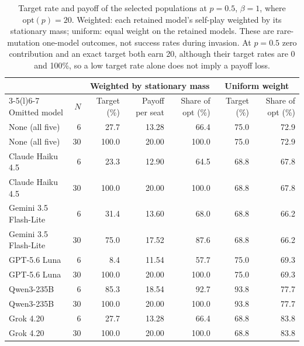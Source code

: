 \begin{table}[!htbp]
\caption{Target rate and payoff of the selected populations at $p=0.5$, $\beta=1$, where $\mathrm{opt}(p)=20$. Weighted: each retained model's self-play weighted by its stationary mass; uniform: equal weight on the retained models. These are rare-mutation one-model outcomes, not success rates during invasion. At $p=0.5$ zero contribution and an exact target both earn 20, although their target rates are 0 and 100\%, so a low target rate alone does not imply a payoff loss.}
\label{tab:review-welfare}
\centering\small\setlength{\tabcolsep}{4pt}
\begin{tabular}{@{}lrrrrrr@{}}
\toprule
 & & \multicolumn{3}{c}{Weighted by stationary mass} & \multicolumn{2}{c}{Uniform weight} \\
\cmidrule(lr){3-5}\cmidrule(l){6-7}
Omitted model & $N$ & Target (\%) & Payoff per seat & Share of opt (\%) & Target (\%) & Share of opt (\%) \\
\midrule
None (all five) & 6 & 27.7 & 13.28 & 66.4 & 75.0 & 72.9 \\
None (all five) & 30 & 100.0 & 20.00 & 100.0 & 75.0 & 72.9 \\
\addlinespace[2pt]
Claude Haiku 4.5 & 6 & 23.3 & 12.90 & 64.5 & 68.8 & 67.8 \\
Claude Haiku 4.5 & 30 & 100.0 & 20.00 & 100.0 & 68.8 & 67.8 \\
\addlinespace[2pt]
Gemini 3.5 Flash-Lite & 6 & 31.4 & 13.60 & 68.0 & 68.8 & 66.2 \\
Gemini 3.5 Flash-Lite & 30 & 75.0 & 17.52 & 87.6 & 68.8 & 66.2 \\
\addlinespace[2pt]
GPT-5.6 Luna & 6 & 8.4 & 11.54 & 57.7 & 75.0 & 69.3 \\
GPT-5.6 Luna & 30 & 100.0 & 20.00 & 100.0 & 75.0 & 69.3 \\
\addlinespace[2pt]
Qwen3-235B & 6 & 85.3 & 18.54 & 92.7 & 93.8 & 77.7 \\
Qwen3-235B & 30 & 100.0 & 20.00 & 100.0 & 93.8 & 77.7 \\
\addlinespace[2pt]
Grok 4.20 & 6 & 27.7 & 13.28 & 66.4 & 68.8 & 83.8 \\
Grok 4.20 & 30 & 100.0 & 20.00 & 100.0 & 68.8 & 83.8 \\
\bottomrule
\end{tabular}
\end{table}

